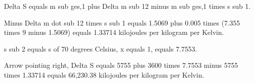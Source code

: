 Delta S equals m sub ges,1 plus Delta m sub 12 minus m sub ges,1 times s sub 1.

Minus Delta m dot sub 12 times s sub 1 equals 1.5069 plus 0.005 times (7.355 times 9 minus 1.5069) equals 1.33714 kilojoules per kilogram per Kelvin.

s sub 2 equals s of 70 degrees Celsius, x equals 1, equals 7.7553.

Arrow pointing right, Delta S equals 5755 plus 3600 times 7.7553 minus 5755 times 1.33714 equals 66,230.38 kilojoules per kilogram per Kelvin.